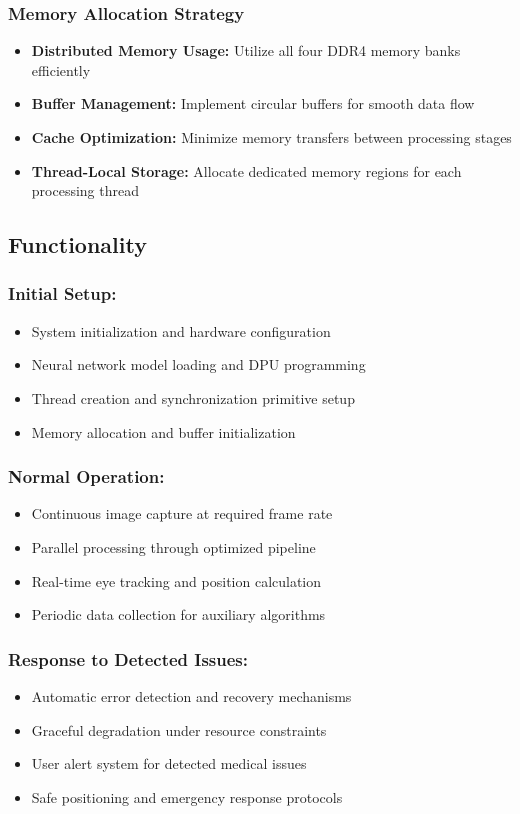 \subsubsection{Memory Allocation Strategy}
\begin{itemize}
\item \textbf{Distributed Memory Usage:} Utilize all four DDR4 memory banks efficiently~\cite{chen2022memory}
\item \textbf{Buffer Management:} Implement circular buffers for smooth data flow
\item \textbf{Cache Optimization:} Minimize memory transfers between processing stages
\item \textbf{Thread-Local Storage:} Allocate dedicated memory regions for each processing thread
\end{itemize}

\subsection{Functionality}\label{subsec:functionality}

\subsubsection{Initial Setup:}
\begin{itemize}
\item System initialization and hardware configuration
\item Neural network model loading and DPU programming
\item Thread creation and synchronization primitive setup
\item Memory allocation and buffer initialization
\end{itemize}

\subsubsection{Normal Operation:}
\begin{itemize}
\item Continuous image capture at required frame rate
\item Parallel processing through optimized pipeline
\item Real-time eye tracking and position calculation
\item Periodic data collection for auxiliary algorithms
\end{itemize}

\subsubsection{Response to Detected Issues:}
\begin{itemize}
\item Automatic error detection and recovery mechanisms
\item Graceful degradation under resource constraints
\item User alert system for detected medical issues
\item Safe positioning and emergency response protocols
\end{itemize}


